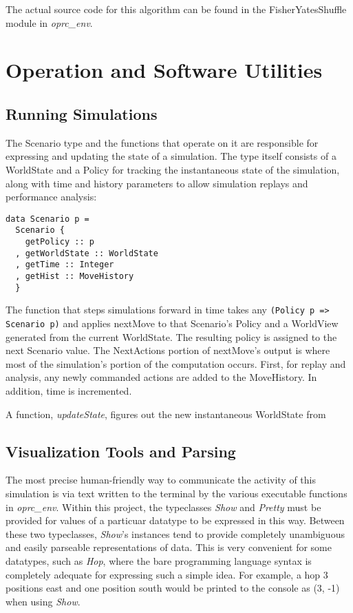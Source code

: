The actual source code for this algorithm can be found in the FisherYatesShuffle module in \textit{oprc\_env}.

\section{Operation and Software Utilities}

\subsection{Running Simulations}

The Scenario type and the functions that operate on it are responsible for expressing and updating the state of a simulation. The type itself consists of a WorldState and a Policy for tracking the instantaneous state of the simulation, along with time and history parameters to allow simulation replays and performance analysis:

\begin{verbatim}
data Scenario p =
  Scenario {
    getPolicy :: p
  , getWorldState :: WorldState
  , getTime :: Integer
  , getHist :: MoveHistory
  }
\end{verbatim}

The function that steps simulations forward in time takes any \verb|(Policy p => Scenario p)| and applies nextMove to that Scenario's Policy and a WorldView generated from the current WorldState. The resulting policy is assigned to the next Scenario value. The NextActions portion of nextMove's output is where most of the simulation's portion of the computation occurs. First, for replay and analysis, any newly commanded actions are added to the MoveHistory. In addition, time is incremented.

A function, \textit{updateState}, figures out the new instantaneous WorldState from

\subsection{Visualization Tools and Parsing}

The most precise human-friendly way to communicate the activity of this simulation is via text written to the terminal by the various executable functions in \textit{oprc\_env}. Within this project, the typeclasses \textit{Show} and \textit{Pretty} must be provided for values of a particuar datatype to be expressed in this way. Between these two typeclasses, \textit{Show}'s instances tend to provide completely unambiguous and easily parseable representations of data. This is very convenient for some datatypes, such as \textit{Hop}, where the bare programming language syntax is completely adequate for expressing such a simple idea. For example, a hop 3 positions east and one position south would be printed to the console as (3, -1) when using \textit{Show}.

